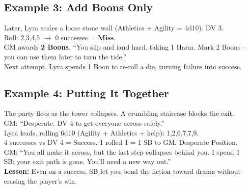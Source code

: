 \subsection*{Example 3: Add Boons Only}
\label{subsec:ex-boons-only}
\begin{tcolorbox}[colback=gray!3,colframe=gray!60,title=\textbf{Example 3 -- Adding Boons}, breakable]
Later, Lyra scales a loose stone wall (Athletics + Agility = 4d10). DV 3.\\
Roll: 2,3,4,5 $\rightarrow$ 0 successes = \textbf{Miss}.\\[0.3em]
GM awards \textbf{2 Boons}. ``You slip and land hard, taking 1 Harm. Mark 2 Boons -- you can use them later to turn the tide.''\\
Next attempt, Lyra spends 1 Boon to re-roll a die, turning failure into success.
\end{tcolorbox}

\subsection*{Example 4: Putting It Together}
\label{subsec:ex-full}
\begin{tcolorbox}[colback=gray!3,colframe=gray!60,title=\textbf{Example 4 -- SB + Boons + Position}, breakable]
The party flees as the tower collapses. A crumbling staircase blocks the exit.\\
GM: ``Desperate. DV 4 to get everyone across safely.''\\
Lyra leads, rolling 6d10 (Agility + Athletics + help): 1,2,6,7,7,9.\\
4 successes vs DV 4 = Success. 1 rolled 1 = 1 SB to GM. Desperate Position.\\
GM: ``You all make it across, but the last step collapses behind you. I spend 1 SB: your exit path is gone. You'll need a new way out.''\\
\textbf{Lesson:} Even on a success, SB let you bend the fiction toward drama without erasing the player's win.
\end{tcolorbox}

